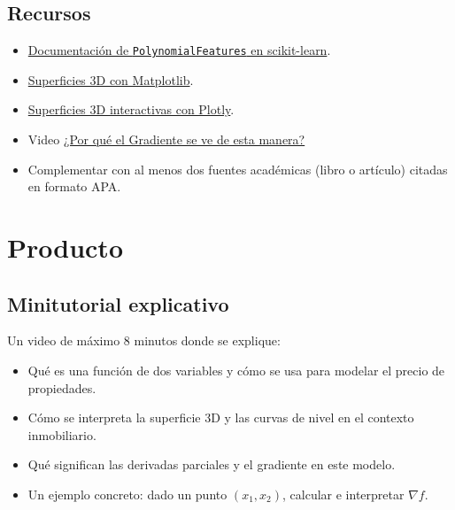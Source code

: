 \documentclass[a4,11pt]{aleph-notas}
\begin{document}
\subsection*{Recursos}
\begin{itemize}[leftmargin=*]
    \item \href{https://scikit-learn.org/stable/modules/generated/sklearn.preprocessing.PolynomialFeatures.html}{Documentación de \texttt{PolynomialFeatures} en scikit-learn}.
    \item \href{https://matplotlib.org/stable/gallery/mplot3d/surface3d.html}{Superficies 3D con Matplotlib}.
    \item \href{https://plotly.com/python/3d-surface-plots/}{Superficies 3D interactivas con Plotly}.
    \item Video \href{https://youtu.be/Ag9GBB3pPkU?si=TgUNvD-IEr8Opy6x}{¿Por qué el Gradiente se ve de esta manera?}
    \item Complementar con al menos dos fuentes académicas (libro o artículo) citadas en formato APA.
\end{itemize}


\section{Producto}

\subsection{Minitutorial explicativo}
Un video de máximo 8 minutos donde se explique:
\begin{itemize}[leftmargin=*]
    \item Qué es una función de dos variables y cómo se usa para modelar el precio de propiedades.
    \item Cómo se interpreta la superficie 3D y las curvas de nivel en el contexto inmobiliario.
    \item Qué significan las derivadas parciales y el gradiente en este modelo.
    \item Un ejemplo concreto: dado un punto $(x_1, x_2)$, calcular e interpretar $\nabla f$.
\end{itemize}
\end{document}
